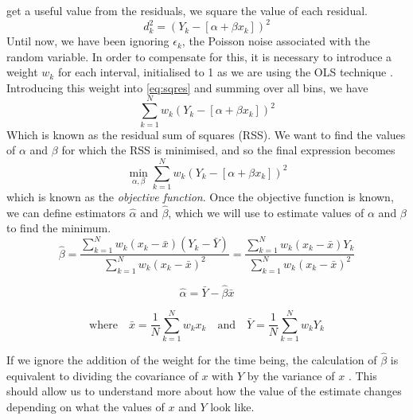 \documentclass[a4paper,11pt]{article}
\begin{document}
get a useful value from the residuals, we square the value of each residual.
\begin{equation}\label{eq:sqres}
d_k^2=(Y_k-[\alpha +\beta x_k])^2
\end{equation}
Until now, we have been ignoring ${\epsilon}_k$, the Poisson noise associated
with the random variable. In order to compensate for this, it is necessary to
introduce a weight $w_k$ for each interval, initialised to 1 as we are using
the OLS technique \cite{massey1996estimating}. Introducing this weight into
\eqref{eq:sqres} and summing over all bins, we have
\begin{equation}
\sum_{k=1}^N w_k(Y_k-[\alpha +\beta x_k])^2
\end{equation}
Which is known as the residual sum of squares (RSS). We want to find the values of
$\alpha$ and $\beta$ for which the RSS is minimised, and so the final expression becomes
\begin{equation}
\min_{\alpha,\beta}\sum_{k=1}^N w_k(Y_k-[\alpha +\beta x_k])^2
\end{equation}
which is known as the \emph{objective function}. Once the objective function is
known, we can define estimators $\hat{\alpha}$ and $\hat{\beta}$, which we
will use to estimate values of $\alpha$ and $\beta$ to find the minimum.
\begin{equation}
\hat{\beta}
=\frac{\displaystyle\sum_{k=1}^N w_k(x_k-\bar{x})(Y_k-\bar{Y})}{\displaystyle \sum_{k=1}^N w_k(x_k-\bar{x})^2}
=\frac{\displaystyle\sum_{k=1}^N w_k(x_k-\bar{x})Y_k}{\displaystyle\sum_{k=1}^N w_k(x_k-\bar{x})^2}
\end{equation}

\begin{equation}
\hat{\alpha}=\bar{Y}-\hat{\beta}\bar{x}
\end{equation}

\begin{equation}
\text{where}\quad
\bar{x}=\frac{1}{N}\sum_{k=1}^N w_kx_k\quad \text{and}\quad
\bar{Y}=\frac{1}{N}\sum_{k=1}^N w_kY_k
\end{equation}

If we ignore the addition of the weight for the time being, the calculation of
$\hat{\beta}$ is equivalent to dividing the covariance of $x$ with $Y$ by the
variance of $x$ \cite{kenney1962mathematics}. This should allow us to understand
more about how the value of the estimate changes depending on what the values of
$x$ and $Y$ look like.
\end{document}
